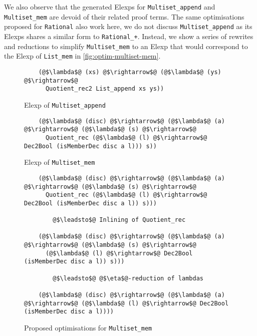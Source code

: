 \documentclass[12pt,twoside,maitrise]{dms}
\theoremstyle{definition}
\numberwithin{equation}{section}
\numberwithin{table}{chapter}
\numberwithin{figure}{chapter}
\newcommand\id[1] {\texttt{#1}}
\begin{document}
We also observe that the generated Elexps for \id{Multiset\_append} and
\id{Multiset\_mem} are devoid of their related proof terms. The same
optimisations proposed for \id{Rational} also work here, we do not discuss
\id{Multiset\_append} as its Elexps shares a similar form to \id{Rational\_+}.
Instead, we show a series of rewrites and reductions to simplify
\id{Multiset\_mem} to an Elexp that would correspond to the Elexp of
\id{List\_mem} in \autoref{fig:optim-multiset-mem}.

\begin{figure}
\begin{verbatim}
    (@$\lambda$@ (xs) @$\rightarrow$@ (@$\lambda$@ (ys) @$\rightarrow$@
      Quotient_rec2 List_append xs ys))
\end{verbatim}
\caption{Elexp of \id{Multiset\_append}}
\end{figure}

\begin{figure}
\begin{verbatim}
    (@$\lambda$@ (disc) @$\rightarrow$@ (@$\lambda$@ (a) @$\rightarrow$@ (@$\lambda$@ (s) @$\rightarrow$@
      Quotient_rec (@$\lambda$@ (l) @$\rightarrow$@ Dec2Bool (isMemberDec disc a l))) s))
\end{verbatim}
\caption{Elexp of \id{Multiset\_mem}}
\end{figure}

\begin{figure}
\begin{mdframed}
\begin{verbatim}
    (@$\lambda$@ (disc) @$\rightarrow$@ (@$\lambda$@ (a) @$\rightarrow$@ (@$\lambda$@ (s) @$\rightarrow$@
      Quotient_rec (@$\lambda$@ (l) @$\rightarrow$@ Dec2Bool (isMemberDec disc a l)) s)))

        @$\leadsto$@ Inlining of Quotient_rec

    (@$\lambda$@ (disc) @$\rightarrow$@ (@$\lambda$@ (a) @$\rightarrow$@ (@$\lambda$@ (s) @$\rightarrow$@
      (@$\lambda$@ (l) @$\rightarrow$@ Dec2Bool (isMemberDec disc a l)) s)))

        @$\leadsto$@ @$\eta$@-reduction of lambdas

    (@$\lambda$@ (disc) @$\rightarrow$@ (@$\lambda$@ (a) @$\rightarrow$@ (@$\lambda$@ (l) @$\rightarrow$@ Dec2Bool (isMemberDec disc a l))))
\end{verbatim}
\end{mdframed}
\caption{Proposed optimisations for \id{Multiset\_mem}}\label{fig:optim-multiset-mem}
\end{figure}
\end{document}
